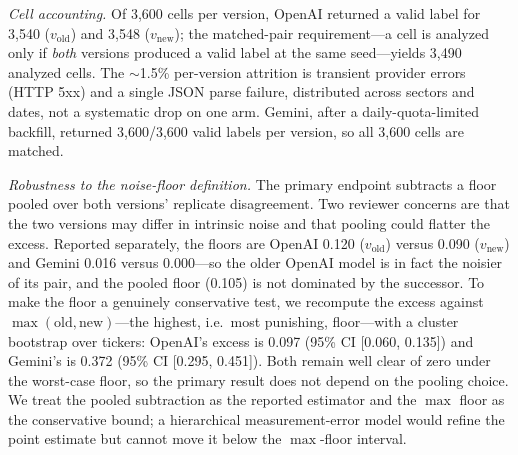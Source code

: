 \documentclass[10pt,twocolumn]{article}
\begin{document}
\noindent\emph{Cell accounting.} Of 3{,}600 cells per version, OpenAI returned a valid label for 3{,}540 ($v_{\mathrm{old}}$) and 3{,}548 ($v_{\mathrm{new}}$); the matched-pair requirement---a cell is analyzed only if \emph{both} versions produced a valid label at the same seed---yields 3{,}490 analyzed cells. The $\sim$1.5\% per-version attrition is transient provider errors (HTTP 5xx) and a single JSON parse failure, distributed across sectors and dates, not a systematic drop on one arm. Gemini, after a daily-quota-limited backfill, returned 3{,}600/3{,}600 valid labels per version, so all 3{,}600 cells are matched.

\noindent\emph{Robustness to the noise-floor definition.} The primary endpoint subtracts a floor pooled over both versions' replicate disagreement. Two reviewer concerns are that the two versions may differ in intrinsic noise and that pooling could flatter the excess. Reported separately, the floors are OpenAI 0.120 ($v_{\mathrm{old}}$) versus 0.090 ($v_{\mathrm{new}}$) and Gemini 0.016 versus 0.000---so the older OpenAI model is in fact the noisier of its pair, and the pooled floor (0.105) is not dominated by the successor. To make the floor a genuinely conservative test, we recompute the excess against $\max(\text{old},\text{new})$---the highest, i.e.\ most punishing, floor---with a cluster bootstrap over tickers: OpenAI's excess is 0.097 (95\% CI [0.060, 0.135]) and Gemini's is 0.372 (95\% CI [0.295, 0.451]). Both remain well clear of zero under the worst-case floor, so the primary result does not depend on the pooling choice. We treat the pooled subtraction as the reported estimator and the $\max$ floor as the conservative bound; a hierarchical measurement-error model would refine the point estimate but cannot move it below the $\max$-floor interval.
\end{document}
